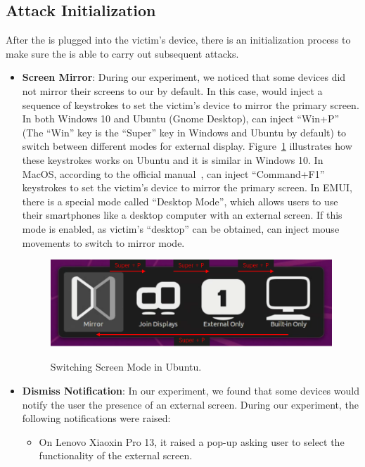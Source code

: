 \subsection{Attack Initialization}
\label{subsec:attack_init}
After the \tool is plugged into the victim's device, there is an initialization process to make sure the \tool is able to carry out subsequent attacks.
\begin{itemize}
	\item \textbf{Screen Mirror}:
		During our experiment, we noticed that some devices did not mirror their screens to our \tool by default. In this case, \tool would inject a sequence of keystrokes to set the victim's device to mirror the primary screen. In both Windows 10 and Ubuntu (Gnome Desktop), \tool can inject ``Win+P'' (The ``Win'' key is the ``Super'' key in Windows and Ubuntu by default) to switch between different modes for external display. Figure~\ref{fig:ubuntu_switch} illustrates how these keystrokes works on Ubuntu and it is similar in Windows 10. In MacOS, according to the official manual~\cite{appleman}, \tool can inject \mbox{``Command+F1''} keystrokes to set the victim's device to mirror the primary screen. In EMUI, there is a special mode called ``Desktop Mode'', which allows users to use their smartphones like a desktop computer with an external screen. If this mode is enabled, as victim's ``desktop'' can be obtained, \tool can inject mouse movements to switch to mirror mode.
		\begin{figure}[H]
			\includegraphics[width=\linewidth]{./Figs/ubuntu_switch.png}\\
			\caption{Switching Screen Mode in Ubuntu.}
			\label{fig:ubuntu_switch}
		\end{figure}
	\item \textbf{Dismiss Notification}:
		In our experiment, we found that some devices would notify the user the presence of an external screen. During our experiment, the following notifications were raised:
		\begin{itemize}
		 \item On Lenovo Xiaoxin Pro 13, it raised a pop-up asking user to select the functionality of the external screen.

\end{itemize}
\end{itemize}
